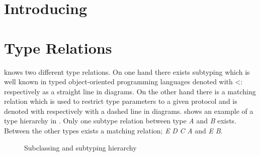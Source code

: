 
\section{Introducing \mytype}


\section{Type Relations}
\ooplss knows two different type relations. On one hand there exists
subtyping which is well known in typed object-oriented programming
languages denoted with <: respectively as a straight line in diagrams. On
the other hand there is a matching relation which is used to restrict type
parameters to a given protocol and is denoted with \match respectively
with a dashed line in diagrams.  shows an example of
a type hierarchy in \ooplss. Only one subtype relation between type \emph{A}
and \emph{B} exists. Between the other types exists a matching relation; \emph{E}
\match \emph{D} \match \emph{C} \match \emph{A} and \emph{E} \match \emph{B}.


\begin{figure}[h]
	\centering
	\caption{Subclassing and subtyping hierarchy}
	\label{fig:hierarchy}
\end{figure}



